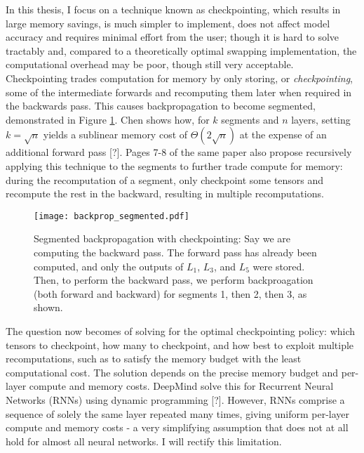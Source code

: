 In this thesis, I focus on a technique known as checkpointing, which results in large memory savings, is much simpler to implement, does not affect model accuracy and requires minimal effort from the user; though it is hard to solve tractably and, compared to a theoretically optimal swapping implementation, the computational overhead may be poor, though still very acceptable. \\

Checkpointing trades computation for memory by only storing, or \textit{checkpointing}, some of the intermediate forwards and recomputing them later when required in the backwards pass. This causes backpropagation to become segmented, demonstrated in Figure \ref{fig:1-backprop-segmented}. Chen shows how, for \(k\) segments and \(n\) layers, setting \(k = \sqrt{n}\) yields a sublinear memory cost of \(\Theta (2\sqrt{n})\) at the expense of an additional forward pass [?]. Pages 7-8 of the same paper also propose recursively applying this technique to the segments to further trade compute for memory: during the recomputation of a segment, only checkpoint some tensors and recompute the rest in the backward, resulting in multiple recomputations. \\

\begin{figure}[t]
    \centering
    \texttt{[image: backprop\_segmented.pdf]}
    \caption{Segmented backpropagation with checkpointing: Say we are computing the backward pass. The forward pass has already been computed, and only the outputs of \(L_1\), \(L_3\), and \(L_5\) were stored. Then, to perform the backward pass, we perform backproagation (both forward and backward) for segments 1, then 2, then 3, as shown.}
    \label{fig:1-backprop-segmented}
\end{figure}

The question now becomes of solving for the optimal checkpointing policy: which tensors to checkpoint, how many to checkpoint, and how best to exploit multiple recomputations, such as to satisfy the memory budget with the least computational cost. The solution depends on the precise memory budget and per-layer compute and memory costs. DeepMind solve this for Recurrent Neural Networks (RNNs) using dynamic programming [?]. However, RNNs comprise a sequence of solely the same layer repeated many times, giving uniform per-layer compute and memory costs - a very simplifying assumption that does not at all hold for almost all neural networks. I will rectify this limitation. \\

